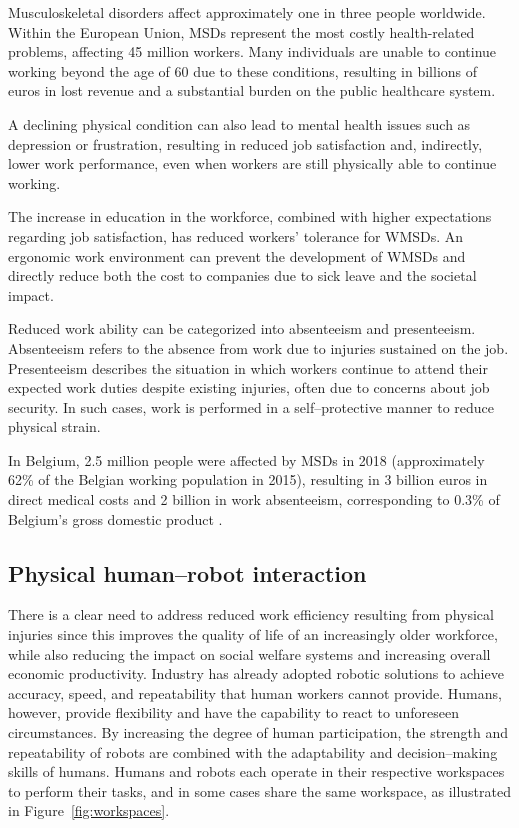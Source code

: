 \documentclass[11pt,a4paper,twoside,openright]{book}
\begin{document}
Musculoskeletal disorders affect approximately one in three people worldwide. Within the European Union, MSDs represent the most costly health-related problems, affecting 45 million workers. Many individuals are unable to continue working beyond the age of 60 due to these conditions, resulting in billions of euros in lost revenue and a substantial burden on the public healthcare system.

A declining physical condition can also lead to mental health issues such as depression or frustration, resulting in reduced job satisfaction and, indirectly, lower work performance, even when workers are still physically able to continue working.

The increase in education in the workforce, combined with higher expectations regarding job satisfaction, has reduced workers' tolerance for WMSDs. An ergonomic work environment can prevent the development of WMSDs and directly reduce both the cost to companies due to sick leave and the societal impact.  

Reduced work ability can be categorized into absenteeism and presenteeism. Absenteeism refers to the absence from work due to injuries sustained on the job. Presenteeism describes the situation in which workers continue to attend their expected work duties despite existing injuries, often due to concerns about job security. In such cases, work is performed
in a self--protective manner to reduce physical strain.

In Belgium, 2.5 million people were affected by MSDs in 2018 (approximately 62\% of the Belgian working population in 2015), resulting in 3 billion euros in direct medical costs and 2 billion in work absenteeism, corresponding to 0.3\% of Belgium's gross domestic product
\cite{oralEvaluationAbsenteeismPresenteeism2024}\cite{yassiRepetitiveStrainInjuries}\cite{vilellaMusculoskeletalExamination}\cite{ibvMusculoskeletalDisordersCaused2017}\cite{gorassoHealthEconomicBurden2023}.

\subsection{Physical human--robot interaction}
\label{subs:ph-h-r}
There is a clear need to address reduced work efficiency resulting from physical injuries since this improves the quality of life of an increasingly older workforce, while also reducing the impact on social welfare systems and increasing overall economic productivity. Industry has already adopted robotic solutions to achieve accuracy, speed, and repeatability that human workers cannot provide. Humans, however, provide flexibility and have the capability to react to unforeseen circumstances. By increasing the degree of human participation, the strength and repeatability of robots are combined with the adaptability and decision--making skills of humans. Humans and robots each operate in their respective workspaces to perform their tasks, and in some cases share the same workspace, as illustrated in Figure~\ref{fig:workspaces}.
\end{document}
